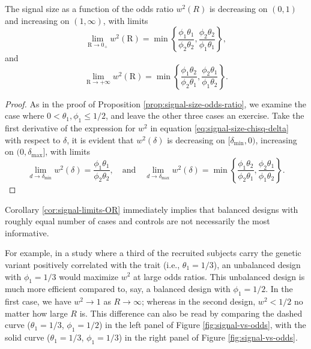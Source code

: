 \begin{corollary} \label{cor:signal-limits-OR}
The signal size as a function of the odds ratio $w^2(R)$ is decreasing on $(0,1)$ and increasing on $(1,\infty)$, with limits
\begin{equation} \label{eq:signal-size-upper-bound-1}
    \lim_{\text{R}\to0_+} w^2(\text{R}) = \min\left\{\frac{\phi_1\theta_1}{\phi_2\theta_2}, \frac{\phi_2\theta_2}{\phi_1\theta_1}\right\},
\end{equation}
and
\begin{equation} \label{eq:signal-size-upper-bound-2}
    \lim_{\text{R}\to+\infty} w^2(\text{R}) = \min\left\{\frac{\phi_1\theta_2}{\phi_2\theta_1}, \frac{\phi_2\theta_1}{\phi_1\theta_2}\right\}.
\end{equation}
\end{corollary}

\begin{proof}
	As in the proof of Proposition \ref{prop:signal-size-odds-ratio}, we examine the case where $0<\theta_1,\phi_1\le1/2$, and leave the other three cases an exercise.
	Take the first derivative of the expression for $w^2$ in equation \eqref{eq:signal-size-chisq-delta} with respect to $\delta$, it is evident that $w^2(\delta)$ is decreasing on $[\delta_\mathrm{min},0)$, increasing on $(0,\delta_\mathrm{max}]$, with limits
	$$
	\lim_{d\to \delta_\mathrm{min}} w^2(\delta) = \frac{\phi_1\theta_1}{\phi_2\theta_2},
	\quad
	\text{and}
	\quad
	\lim_{d\to \delta_\mathrm{max}} w^2(\delta) = \min\left\{\frac{\phi_1\theta_2}{\phi_2\theta_1}, \frac{\phi_2\theta_1}{\phi_1\theta_2}\right\}.
	$$
\end{proof}

Corollary \ref{cor:signal-limits-OR} immediately implies that balanced designs with roughly equal number of cases and controls are not necessarily the most informative.

For example, in a study where a third of the recruited subjects carry the genetic variant positively correlated with the trait (i.e., $\theta_1=1/3$), an unbalanced design with $\phi_1=1/3$ would maximize $w^2$ at large odds ratios.
This unbalanced design is much more efficient compared to, say, a balanced design with $\phi_1=1/2$.
In the first case, we have $w^2\to1$ as $R\to\infty$; whereas in the second design, $w^2<1/2$ no matter how large $R$ is.
This difference can also be read by comparing the dashed curve ($\theta_1=1/3$, $\phi_1=1/2$) in the left panel of Figure \ref{fig:signal-vs-odds}, with the solid curve ($\theta_1=1/3$, $\phi_1=1/3$) in the right panel of Figure \ref{fig:signal-vs-odds}.
